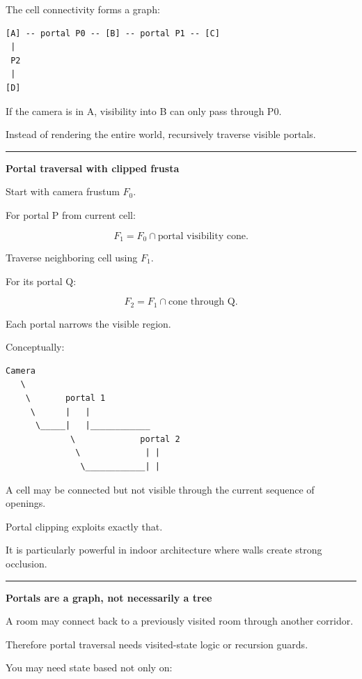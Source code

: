 The cell connectivity forms a graph:

\begin{verbatim}
[A] -- portal P0 -- [B] -- portal P1 -- [C]
 |
 P2
 |
[D]
\end{verbatim}

If the camera is in A, visibility into B can only pass through P0.

Instead of rendering the entire world, recursively traverse visible portals.

\begin{center}\rule{0.5\linewidth}{0.5pt}\end{center}

\textbf{Portal traversal with clipped frusta}

Start with camera frustum \(F_0\).

For portal P from current cell:

\[
F_1=
F_0\cap
\text{portal visibility cone}.
\]

Traverse neighboring cell using \(F_1\).

For its portal Q:

\[
F_2=
F_1\cap
\text{cone through Q}.
\]

Each portal narrows the visible region.

Conceptually:

\begin{verbatim}
Camera
   \
    \       portal 1
     \      |   |
      \_____|   |____________
             \             portal 2
              \             | |
               \____________| |
\end{verbatim}

A cell may be connected but not visible through the current sequence of openings.

Portal clipping exploits exactly that.

It is particularly powerful in indoor architecture where walls create strong occlusion.

\begin{center}\rule{0.5\linewidth}{0.5pt}\end{center}

\textbf{Portals are a graph, not necessarily a tree}

A room may connect back to a previously visited room through another corridor.

Therefore portal traversal needs visited-state logic or recursion guards.

You may need state based not only on:


